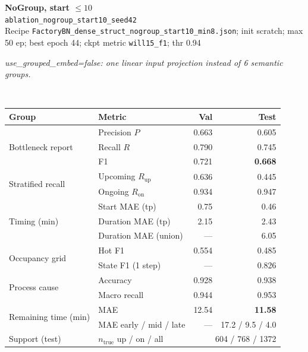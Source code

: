 \documentclass[9pt,a4paper,twocolumn]{extarticle}
\begin{document}
\noindent\begin{minipage}{\columnwidth}
\begin{center}
{\small\bfseries NoGroup, start $\le 10$}\\
{\scriptsize\texttt{ablation\_nogroup\_start10\_seed42}}\\
{\scriptsize Recipe \texttt{FactoryBN\_dense\_struct\_nogroup\_start10\_min8.json}; init scratch; max 50 ep; best epoch 44; ckpt metric \texttt{will15\_f1}; thr 0.94}\\[1pt]
\parbox{0.96\columnwidth}{\scriptsize\itshape use\_grouped\_embed=false: one linear input projection instead of 6 semantic groups.}\\[2pt]
\scriptsize\setlength{\tabcolsep}{3pt}
\begin{tabular}{llrr}
\toprule
Group & Metric & Val & Test \\
\midrule
\multirow{3}{*}{Bottleneck report}
  & Precision $P$ & 0.663 & 0.605 \\
  & Recall $R$ & 0.790 & 0.745 \\
  & F1 & 0.721 & \textbf{0.668} \\
\midrule
\multirow{2}{*}{Stratified recall}
  & Upcoming $R_{\mathrm{up}}$ & 0.636 & 0.445 \\
  & Ongoing $R_{\mathrm{on}}$ & 0.934 & 0.947 \\
\midrule
\multirow{3}{*}{Timing (min)}
  & Start MAE (tp) & 0.75 & 0.46 \\
  & Duration MAE (tp) & 2.15 & 2.43 \\
  & Duration MAE (union) & --- & 6.05 \\
\midrule
\multirow{2}{*}{Occupancy grid}
  & Hot F1 & 0.554 & 0.485 \\
  & State F1 (1 step) & --- & 0.826 \\
\midrule
\multirow{2}{*}{Process cause}
  & Accuracy & 0.928 & 0.938 \\
  & Macro recall & 0.944 & 0.953 \\
\midrule
\multirow{2}{*}{Remaining time (min)}
  & MAE & 12.54 & \textbf{11.58} \\
  & MAE early / mid / late & --- & 17.2 / 9.5 / 4.0 \\
\midrule
Support (test)
  & $n_{\mathrm{true}}$ up / on / all & \multicolumn{2}{r}{604 / 768 / 1372} \\
\bottomrule
\end{tabular}
\end{center}
\end{minipage}\par\vspace{6pt}
\end{document}
